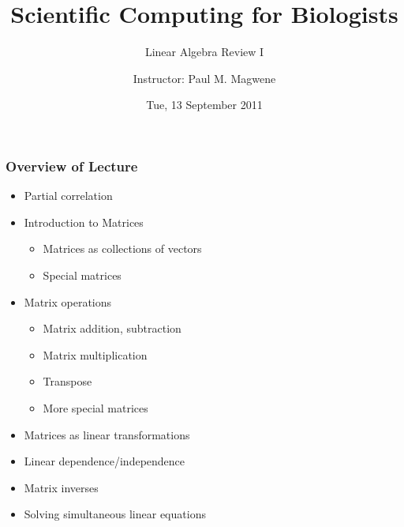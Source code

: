 \documentclass{beamer}
\title{Scientific Computing for Biologists}
\subtitle{Linear Algebra Review I} %
\author{Instructor: Paul M. Magwene}
\date{Tue, 13 September 2011}
\begin{document}
\begin{frame}
\titlepage
\end{frame}

\begin{frame}
  \frametitle{Overview of Lecture}
  
\begin{itemize}
        \item Partial correlation
		\item Introduction to Matrices
		\begin{itemize}
			\item Matrices as collections of vectors
			\item Special matrices
		\end{itemize}
		\item Matrix operations
		\begin{itemize}
			\item Matrix addition, subtraction
			\item Matrix multiplication
		  \item Transpose			
		  \item More special matrices		  
		\end{itemize}		
	  \item Matrices as linear transformations		
		\item Linear dependence/independence
		\item Matrix inverses		
		\item Solving simultaneous linear equations
\end{itemize}

\end{frame}
\end{document}
